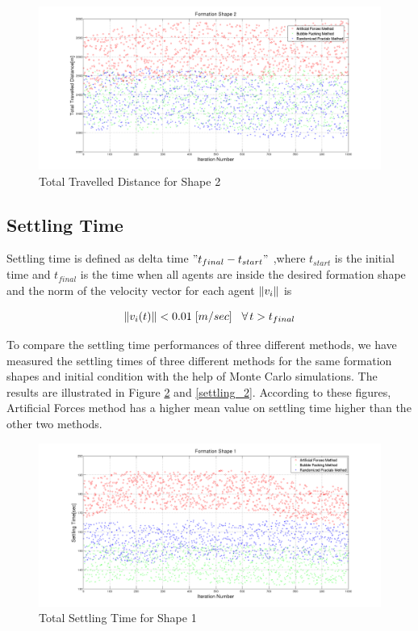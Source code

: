 \begin{figure}[H]
\caption{Total Travelled Distance for Shape 2} \label{total_dist_2}
\centerline{\includegraphics[scale = 0.32]{Total_Energy_Shape_2}} 
\end{figure} 	
		   
\subsection{Settling Time} \label{settling_ref}
Settling time is defined as delta time $"t_{final} - t_{start}"$ ,where $t_{start}$ is the initial time and $t_{final}$ is the time when all agents are inside the desired formation shape and the norm of the velocity vector for each agent $\left\lVert v_i\right\rVert$ is
		
\begin{equation}
\left\lVert v_i(t)\right\rVert < 0.01 \hspace{0.1cm} [m/sec] \hspace{0.3cm}\forall\hspace{0.05cm} t>t_{final}
\end{equation}
		
To compare the settling time performances of three different methods, we have measured the settling times of three different methods for the same formation shapes and initial condition with the help of Monte Carlo simulations. The results are illustrated in Figure \ref{settling_1} and \ref{settling_2}. According to these figures, Artificial Forces method has a higher mean value on settling time higher than the other two methods.
		
\begin{figure}[H]
\caption{Total Settling Time for Shape 1} \label{settling_1}
\centerline{\includegraphics[scale = 0.32]{Total_Time_Shape_1}}
\end{figure} 
		
